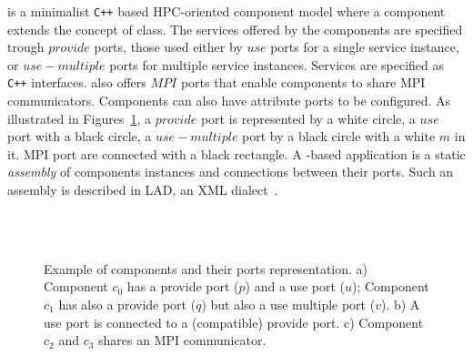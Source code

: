 \llc is a minimalist \texttt{C++} based HPC-oriented component model
where a component extends the concept of class.
The services offered by the components are specified trough $provide$ ports,
those used either by $use$ ports for a single service instance,
or $use-multiple$ ports for multiple service instances.
Services are specified as \texttt{C++} interfaces.
\llc also offers $MPI$ ports that enable components to share MPI communicators.
Components can also have attribute ports to be configured.
%
As illustrated in Figures~\ref{fig:ports}, a $provide$ port is
represented by a white circle, a $use$
port with a black circle, a $use-multiple$ port by a black circle with
a white $m$ in it. MPI port are
connected with a black rectangle.
A \llc-based application is a static \emph{assembly} of components instances and connections between their ports.
Such an assembly is described in LAD, an XML dialect~\cite{l2c}.

\begin{figure}[t]
\begin{center}
\\
\\
\caption{Example of components and their ports representation. a) Component $c_0$ has a provide port ($p$) and a use port ($u$); Component $c_1$ has also a provide port ($q$) but also a use multiple port ($v$). b) A use port is connected to a (compatible) provide port. c) Component $c_2$ and $c_3$ shares an MPI communicator.}
\label{fig:ports}
\end{center}
\end{figure}

